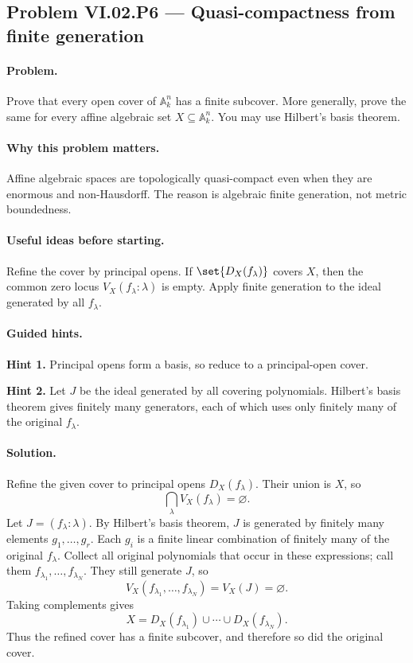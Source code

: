 \subsection*{Problem VI.02.P6 --- Quasi-compactness from finite generation}
\label{prob:vi02-p6}

\paragraph{Problem.}
Prove that every open cover of \(\mathbb A_k^n\) has a finite subcover.  More generally,
prove the same for every affine algebraic set \(X\subseteq\mathbb A_k^n\).  You may use
Hilbert's basis theorem.

\ifdefined\FullProblemDossiers
\paragraph{Why this problem matters.}
Affine algebraic spaces are topologically quasi-compact even when they are enormous and
non-Hausdorff.  The reason is algebraic finite generation, not metric boundedness.

\paragraph{Useful ideas before starting.}
Refine the cover by principal opens.  If \(\set{D_X(f_\lambda)}\) covers \(X\), then the
common zero locus \(V_X(f_\lambda:\lambda)\) is empty.  Apply finite generation to the ideal
generated by all \(f_\lambda\).

\paragraph{Guided hints.}
\textbf{Hint 1.} Principal opens form a basis, so reduce to a principal-open cover.

\textbf{Hint 2.} Let \(J\) be the ideal generated by all covering polynomials.  Hilbert's
basis theorem gives finitely many generators, each of which uses only finitely many of the
original \(f_\lambda\).

\paragraph{Solution.}
Refine the given cover to principal opens \(D_X(f_\lambda)\).  Their union is \(X\), so
\[
\bigcap_\lambda V_X(f_\lambda)=\varnothing.
\]
Let \(J=(f_\lambda:\lambda)\).  By Hilbert's basis theorem, \(J\) is generated by finitely
many elements \(g_1,\dots,g_r\).  Each \(g_i\) is a finite linear combination of finitely
many of the original \(f_\lambda\).  Collect all original polynomials that occur in these
expressions; call them \(f_{\lambda_1},\dots,f_{\lambda_N}\).  They still generate \(J\), so
\[
V_X(f_{\lambda_1},\dots,f_{\lambda_N})=V_X(J)=\varnothing.
\]
Taking complements gives
\[
X=D_X(f_{\lambda_1})\cup\cdots\cup D_X(f_{\lambda_N}).
\]
Thus the refined cover has a finite subcover, and therefore so did the original cover.

